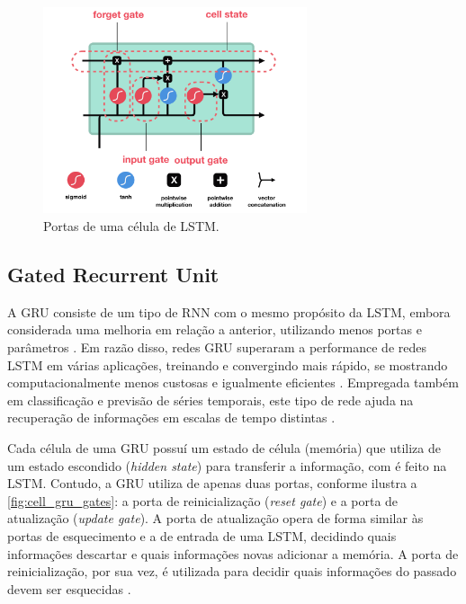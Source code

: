 \begin{figure}[h]
  \centering
  \caption{Portas de uma célula de LSTM.}
   \label{fig:cell_lstm_gates}
   \includegraphics[width=0.69\textwidth]{figuras/fig_9.png}
\end{figure}

\subsection{Gated Recurrent Unit}

A GRU consiste de um tipo de RNN com o mesmo propósito da LSTM, embora considerada uma melhoria em relação a anterior, utilizando menos portas e parâmetros \cite{Kumar2019,Bianchi2017}. Em razão disso, redes GRU superaram a performance de redes LSTM em várias aplicações, treinando e convergindo mais rápido, se mostrando computacionalmente menos custosas e igualmente eficientes \cite{Kumar2019,Bianchi2017}. Empregada também em classificação e previsão de séries temporais, este tipo de rede ajuda na recuperação de informações em escalas de tempo distintas \cite{Bianchi2017,Kumar2019}. 

Cada célula de uma GRU possuí um estado de célula (memória) que utiliza de um estado escondido (\textit{hidden state}) para transferir a informação, com é feito na LSTM. Contudo, a GRU utiliza de apenas duas portas, conforme ilustra a \autoref{fig:cell_gru_gates}: a porta de reinicialização (\textit{reset gate}) e a porta de atualização (\textit{update gate}). A porta de atualização opera de forma similar às portas de esquecimento e a de entrada de uma LSTM, decidindo quais informações descartar e quais informações novas adicionar a memória. A porta de reinicialização, por sua vez, é utilizada para decidir quais informações do passado devem ser esquecidas \cite{Phi2020}.

